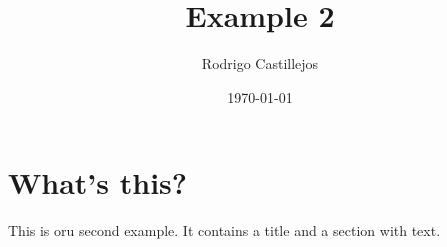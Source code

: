 \documentclass[a4paper,11pt]{article}
\begin{document}
	\title{Example 2}
	\author{Rodrigo Castillejos}
	\date{\today}
	\maketitle
	
	\section{What's this?}
	This is oru second example. It contains a title and a section with text.
\end{document}
